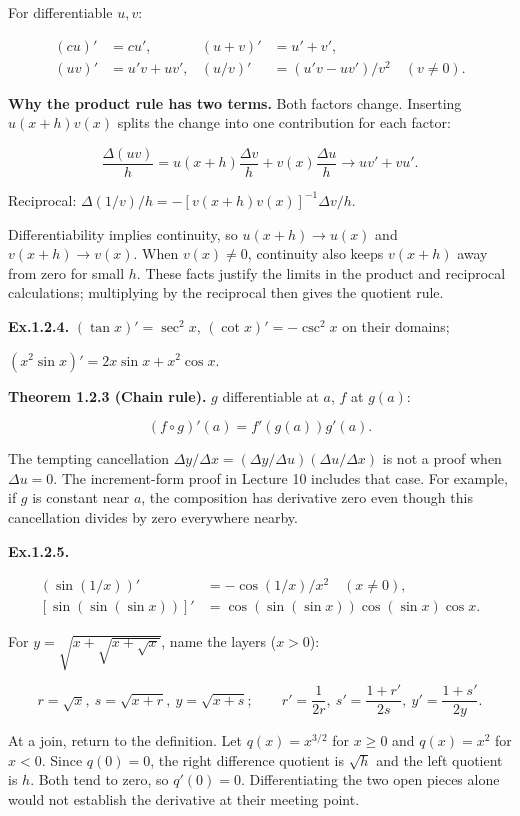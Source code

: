 \documentclass[11pt,a4paper]{article}
\begin{document}
For differentiable \(u,v\):

\[
\begin{aligned}
(cu)'&=cu',&(u+v)'&=u'+v',\\
(uv)'&=u'v+uv',&(u/v)'&=(u'v-uv')/v^2\quad(v\ne0).
\end{aligned}
\]

\textbf{Why the product rule has two terms.} Both factors change.
Inserting \(u(x+h)v(x)\) splits the change into one contribution for
each factor:

\[
\frac{\Delta(uv)}h
=u(x+h)\frac{\Delta v}h+v(x)\frac{\Delta u}h\to uv'+vu'.
\]

Reciprocal: \(\Delta(1/v)/h=-[v(x+h)v(x)]^{-1}\Delta v/h\).

Differentiability implies continuity, so \(u(x+h)\to u(x)\) and
\(v(x+h)\to v(x)\). When \(v(x)\ne0\), continuity also keeps \(v(x+h)\)
away from zero for small \(h\). These facts justify the limits in the
product and reciprocal calculations; multiplying by the reciprocal then
gives the quotient rule.

\textbf{Ex.1.2.4.} \((\tan x)'=\sec^2x\), \((\cot x)'=-\csc^2x\) on
their domains;

\((x^2\sin x)'=2x\sin x+x^2\cos x\).

\textbf{Theorem 1.2.3 (Chain rule).} \(g\) differentiable at \(a\),
\(f\) at \(g(a)\):

\[
(f\circ g)'(a)=f'(g(a))g'(a).
\]

The tempting cancellation
\(\Delta y/\Delta x=(\Delta y/\Delta u)(\Delta u/\Delta x)\) is not a
proof when \(\Delta u=0\). The increment-form proof in Lecture 10
includes that case. For example, if \(g\) is constant near \(a\), the
composition has derivative zero even though this cancellation divides by
zero everywhere nearby.

\textbf{Ex.1.2.5.}

\[
\begin{aligned}
(\sin(1/x))'&=-\cos(1/x)/x^2\quad(x\ne0),\\
[\sin(\sin(\sin x))]'&=\cos(\sin(\sin x))\cos(\sin x)\cos x.
\end{aligned}
\]

For \(y=\sqrt{x+\sqrt{x+\sqrt x}}\), name the layers (\(x>0\)):

\[
r=\sqrt x,\ s=\sqrt{x+r},\ y=\sqrt{x+s};\qquad
r'=\frac1{2r},\ s'=\frac{1+r'}{2s},\ y'=\frac{1+s'}{2y}.
\]

At a join, return to the definition. Let \(q(x)=x^{3/2}\) for \(x\ge0\)
and \(q(x)=x^2\) for \(x<0\). Since \(q(0)=0\), the right difference
quotient is \(\sqrt h\) and the left quotient is \(h\). Both tend to
zero, so \(q'(0)=0\). Differentiating the two open pieces alone would
not establish the derivative at their meeting point.
\end{document}
